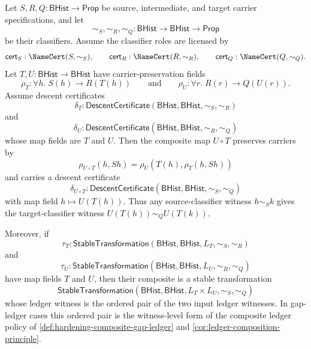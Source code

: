 \begin{theorem}
\label{thm:descent-certificate-stable-transformation-composition}
Let $S,R,Q:\mathsf{BHist}\to\mathsf{Prop}$ be source, intermediate, and target carrier specifications, and let
$$
\sim_S,\sim_R,\sim_Q:\mathsf{BHist}\to\mathsf{BHist}\to\mathsf{Prop}
$$
be their classifiers. Assume the classifier roles are licensed by
$$
\mathsf{cert}_S:\NameCert(S,\sim_S),\qquad
\mathsf{cert}_R:\NameCert(R,\sim_R),\qquad
\mathsf{cert}_Q:\NameCert(Q,\sim_Q).
$$
Let $T,U:\mathsf{BHist}\to\mathsf{BHist}$ have carrier-preservation fields
$$
\rho_T:\forall h.\;S(h)\to R(T(h))
\qquad\text{and}\qquad
\rho_U:\forall r.\;R(r)\to Q(U(r)).
$$
Assume descent certificates
$$
\delta_T:\mathsf{DescentCertificate}(\mathsf{BHist},\mathsf{BHist},\sim_S,\sim_R)
$$
and
$$
\delta_U:\mathsf{DescentCertificate}(\mathsf{BHist},\mathsf{BHist},\sim_R,\sim_Q)
$$
whose map fields are $T$ and $U$. Then the composite map $U\circ T$ preserves carriers by
$$
\rho_{U\circ T}(h,Sh)=\rho_U(T(h),\rho_T(h,Sh))
$$
and carries a descent certificate
$$
\delta_{U\circ T}:\mathsf{DescentCertificate}(\mathsf{BHist},\mathsf{BHist},\sim_S,\sim_Q)
$$
with map field $h\mapsto U(T(h))$. Thus any source-classifier witness $h\sim_S k$ gives the target-classifier witness $U(T(h))\sim_Q U(T(k))$.

Moreover, if
$$
\tau_T:\mathsf{StableTransformation}(\mathsf{BHist},\mathsf{BHist},L_T,\sim_S,\sim_R)
$$
and
$$
\tau_U:\mathsf{StableTransformation}(\mathsf{BHist},\mathsf{BHist},L_U,\sim_R,\sim_Q)
$$
have map fields $T$ and $U$, then their composite is a stable transformation
$$
\mathsf{StableTransformation}(\mathsf{BHist},\mathsf{BHist},L_T\times L_U,\sim_S,\sim_Q)
$$
whose ledger witness is the ordered pair of the two input ledger witnesses. In gap-ledger cases this ordered pair is the witness-level form of the composite ledger policy of \autoref{def:hardening-composite-gap-ledger} and \autoref{cor:ledger-composition-principle}.
\end{theorem}
